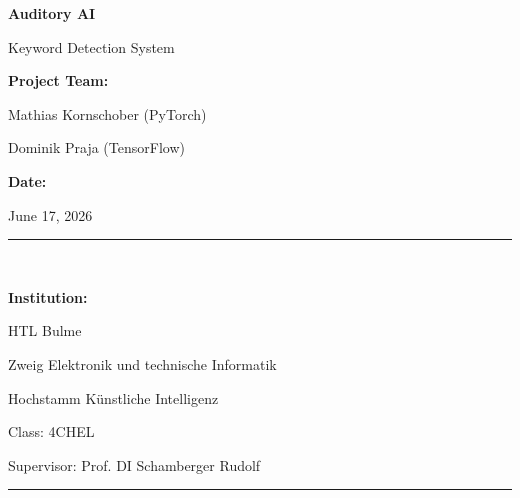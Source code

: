 \documentclass[11pt,a4paper]{article}
\begin{document}
\color{charcoal} %

\begin{titlepage}
    \centering
    \vspace*{1.5cm}

    {\Huge\bfseries\color{darkcharcoal} Auditory AI \par}
    \vspace{0.6cm}
    {\Large\color{charcoal} Keyword Detection System \par}

    \vspace{2.5cm}

    {\large\bfseries\color{darkcharcoal} Project Team: \par}
    \vspace{0.4cm}
    {\large\color{charcoal} Mathias Kornschober (PyTorch) \par}
    {\large Dominik Praja (TensorFlow) \par}

    \vspace{1.5cm}

    {\large\bfseries\color{darkcharcoal} Date: \par}
    \vspace{0.3cm}
    {\large\color{charcoal} June 17, 2026 \par}

    \vfill

    \rule{\linewidth}{0.4mm} \\[0.4cm]
    {\large\bfseries\color{darkcharcoal} Institution: \par}
    \vspace{0.3cm}
    {\large\color{charcoal} HTL Bulme \par}
    {\large Zweig Elektronik und technische Informatik \par}
    {\large Hochstamm Künstliche Intelligenz \par}
    \vspace{0.2cm}
    {\large Class: 4CHEL \par}
    {\large Supervisor: Prof. DI Schamberger Rudolf \par}
    \rule{\linewidth}{0.4mm} \\[1cm]

\end{titlepage}

\newpage
\setcounter{tocdepth}{2}
\tableofcontents
\end{document}
